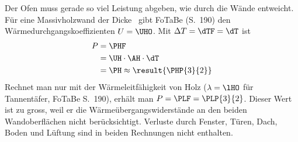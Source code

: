 Der Ofen muss gerade so viel Leistung abgeben, wie durch die Wände entweicht. Für eine Massivholzwand der Dicke \dHO\ gibt FoTaBe (S.~190) den Wärmedurchgangskoeffizienten $U = \UHO$. Mit $\Delta T = \dTF = \dT$ ist
\begin{align}
 P &= \PHF \\
   &= \UH\cdot\AH\cdot\dT \\
   &= \PH \approx \result{\PHP{3}{2}}
\end{align}
Rechnet man nur mit der Wärmeleitfähigkeit von Holz ($\lambda = \lHO$ für Tannentäfer, FoTaBe S.~190), erhält man $P = \PLF = \PLP{3}{2}$. Dieser Wert ist zu gross, weil er die Wärmeübergangswiderstände an den beiden Wandoberflächen nicht berücksichtigt. Verluste durch Fenster, Türen, Dach, Boden und Lüftung sind in beiden Rechnungen nicht enthalten.
